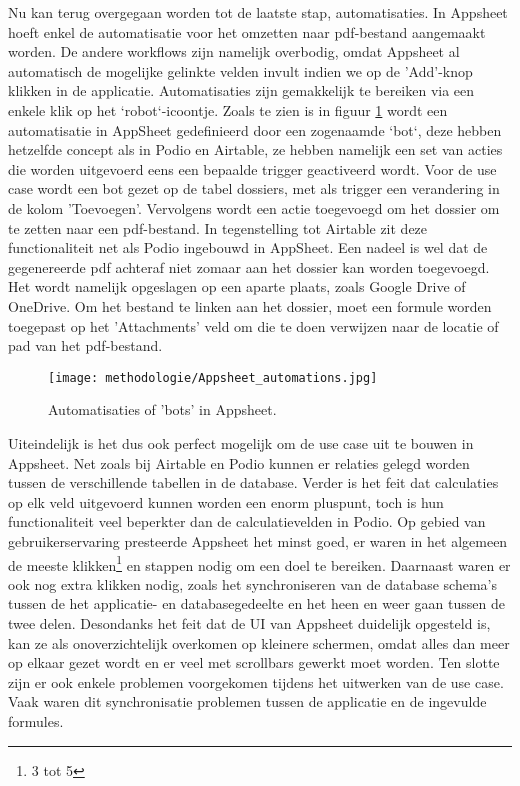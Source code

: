 Nu kan terug overgegaan worden tot de laatste stap, automatisaties. In Appsheet hoeft enkel de automatisatie voor het omzetten naar pdf-bestand aangemaakt worden. De andere workflows zijn namelijk overbodig, omdat Appsheet al automatisch de mogelijke gelinkte velden invult indien we op de 'Add'-knop klikken in de applicatie. Automatisaties zijn gemakkelijk te bereiken via een enkele klik op het `robot`-icoontje. Zoals te zien is in figuur \ref{fig:meth_appsheet_automations} wordt een automatisatie in AppSheet gedefinieerd door een zogenaamde `bot`, deze hebben hetzelfde concept als in Podio en Airtable, ze hebben namelijk een set van acties die worden uitgevoerd eens een bepaalde trigger geactiveerd wordt. Voor de use case wordt een bot gezet op de tabel dossiers, met als trigger een verandering in de kolom 'Toevoegen'. Vervolgens wordt een actie toegevoegd om het dossier om te zetten naar een pdf-bestand. In tegenstelling tot Airtable zit deze functionaliteit net als Podio ingebouwd in AppSheet. Een nadeel is wel dat de gegenereerde pdf achteraf niet zomaar aan het dossier kan worden toegevoegd. Het wordt namelijk opgeslagen op een aparte plaats, zoals Google Drive of OneDrive. Om het bestand te linken aan het dossier, moet een formule worden toegepast op het 'Attachments' veld om die te doen verwijzen naar de locatie of pad van het pdf-bestand. \\

\begin{figure}[h]
    \centering
    \texttt{[image: methodologie/Appsheet\_automations.jpg]}
    \caption{Automatisaties of 'bots' in Appsheet.}
    \label{fig:meth_appsheet_automations}
\end{figure}


Uiteindelijk is het dus ook perfect mogelijk om de use case uit te bouwen in Appsheet. Net zoals bij Airtable en Podio kunnen er relaties gelegd worden tussen de verschillende tabellen in de database. Verder is het feit dat calculaties op elk veld uitgevoerd kunnen worden een enorm pluspunt, toch is hun functionaliteit veel beperkter dan de calculatievelden in Podio. Op gebied van gebruikerservaring presteerde Appsheet het minst goed, er waren in het algemeen de meeste klikken\footnote{3 tot 5} en stappen nodig om een doel te bereiken. Daarnaast waren er ook nog extra klikken nodig, zoals het synchroniseren van de database schema's tussen de het applicatie- en databasegedeelte en het heen en weer gaan tussen de twee delen. Desondanks het feit dat de UI van Appsheet duidelijk opgesteld is, kan ze als onoverzichtelijk overkomen op kleinere schermen, omdat alles dan meer op elkaar gezet wordt en er veel met scrollbars gewerkt moet worden. Ten slotte zijn er ook enkele problemen voorgekomen tijdens het uitwerken van de use case. Vaak waren dit synchronisatie problemen tussen de applicatie en de ingevulde formules. \\
